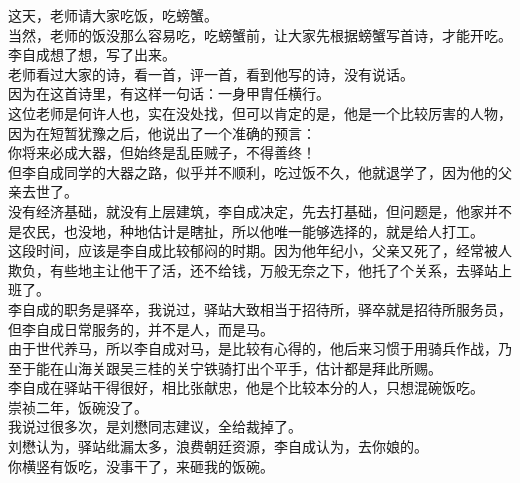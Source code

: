 \begin{multicols}{\theparacolNo}
这天，老师请大家吃饭，吃螃蟹。\\

当然，老师的饭没那么容易吃，吃螃蟹前，让大家先根据螃蟹写首诗，才能开吃。\\

李自成想了想，写了出来。\\

老师看过大家的诗，看一首，评一首，看到他写的诗，没有说话。\\

因为在这首诗里，有这样一句话：一身甲胄任横行。\\

这位老师是何许人也，实在没处找，但可以肯定的是，他是一个比较厉害的人物，因为在短暂犹豫之后，他说出了一个准确的预言：\\

你将来必成大器，但始终是乱臣贼子，不得善终！\\

但李自成同学的大器之路，似乎并不顺利，吃过饭不久，他就退学了，因为他的父亲去世了。\\

没有经济基础，就没有上层建筑，李自成决定，先去打基础，但问题是，他家并不是农民，也没地，种地估计是瞎扯，所以他唯一能够选择的，就是给人打工。\\

这段时间，应该是李自成比较郁闷的时期。因为他年纪小，父亲又死了，经常被人欺负，有些地主让他干了活，还不给钱，万般无奈之下，他托了个关系，去驿站上班了。\\

李自成的职务是驿卒，我说过，驿站大致相当于招待所，驿卒就是招待所服务员，但李自成日常服务的，并不是人，而是马。\\

由于世代养马，所以李自成对马，是比较有心得的，他后来习惯于用骑兵作战，乃至于能在山海关跟吴三桂的关宁铁骑打出个平手，估计都是拜此所赐。\\

李自成在驿站干得很好，相比张献忠，他是个比较本分的人，只想混碗饭吃。\\

崇祯二年，饭碗没了。\\

我说过很多次，是刘懋同志建议，全给裁掉了。\\

刘懋认为，驿站纰漏太多，浪费朝廷资源，李自成认为，去你娘的。\\

你横竖有饭吃，没事干了，来砸我的饭碗。\\


\end{multicols}
